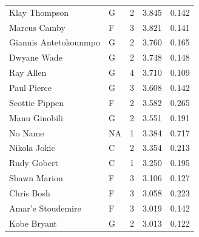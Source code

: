 \begin{table}[t]
\begin{tabular*}{\linewidth}{@{\extracolsep{\fill}}llcrr}
Klay Thompson & G & 2 & 3.845 & 0.142 \\ 
Marcus Camby & F & 3 & 3.821 & 0.141 \\ 
Giannis Antetokounmpo & G & 2 & 3.760 & 0.165 \\ 
Dwyane Wade & G & 2 & 3.748 & 0.148 \\ 
Ray Allen & G & 4 & 3.710 & 0.109 \\ 
Paul Pierce & G & 3 & 3.608 & 0.142 \\ 
Scottie Pippen & F & 2 & 3.582 & 0.265 \\ 
Manu Ginobili & G & 2 & 3.551 & 0.191 \\ 
No Name & NA & 1 & 3.384 & 0.717 \\ 
Nikola Jokic & C & 2 & 3.354 & 0.213 \\ 
Rudy Gobert & C & 1 & 3.250 & 0.195 \\ 
Shawn Marion & F & 3 & 3.106 & 0.127 \\ 
Chris Bosh & F & 3 & 3.058 & 0.223 \\ 
Amar'e Stoudemire & F & 3 & 3.019 & 0.142 \\ 
Kobe Bryant & G & 2 & 3.013 & 0.122 \\ 
\bottomrule
\end{tabular*}
\end{table}

